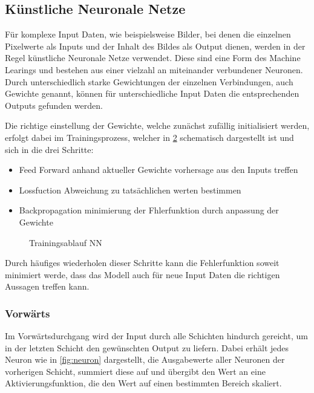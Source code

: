 
\subsection{Künstliche Neuronale Netze} \label{subsec:nn}

Für komplexe Input Daten, wie beispielsweise Bilder, bei denen 
die einzelnen Pixelwerte als Inputs und der Inhalt des Bildes als 
Output dienen, werden in der Regel künstliche Neuronale Netze verwendet.
Diese sind eine Form des Machine Learings und bestehen aus einer 
vielzahl an miteinander verbundener Neuronen. Durch unterschiedlich 
starke Gewichtungen der einzelnen Verbindungen, auch Gewichte genannt, 
können für unterschiedliche Input Daten die entsprechenden Outputs 
gefunden werden.

\begin{figure}[htb]
    \centering
    \label{fig:nn}
    \def\svgwidth{0.5\columnwidth}
    \footnotesize
    
\end{figure}


Die richtige einstellung der Gewichte, welche zunächst zufällig initialisiert werden, 
erfolgt dabei im Trainingsprozess, welcher in \ref{fig:train} schematisch
 dargestellt ist und sich in die drei Schritte:
\begin{itemize}
    \item Feed Forward anhand aktueller Gewichte vorhersage aus den Inputs treffen
    \item Lossfuction Abweichung zu tatsächlichen werten bestimmen
    \item Backpropagation minimierung der Fhlerfunktion durch anpassung der Gewichte
\end{itemize}

\begin{figure}[htb]
    \centering
    \label{fig:train}
    \def\svgwidth{0.5\columnwidth}
    
    \caption{Trainingsablauf NN}
\end{figure}

Durch häufiges wiederholen dieser Schritte kann die Fehlerfunktion soweit minimiert werde, 
dass das Modell auch für neue Input Daten die richtigen Aussagen treffen kann.


\subsubsection{Vorwärts}
Im Vorwärtsdurchgang wird der Input durch alle Schichten hindurch 
gereicht, um in der letzten Schicht den gewünschten Output zu liefern.
Dabei erhält jedes Neuron wie in \ref{fig:neuron} dargestellt, die Ausgabewerte
aller Neuronen der vorherigen Schicht, summiert diese auf und übergibt den Wert
an eine Aktivierungsfunktion, die den Wert auf einen bestimmten Bereich skaliert.


